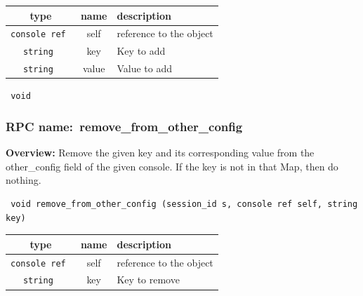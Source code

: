 
 
\vspace{0.3cm}
\begin{tabular}{|c|c|p{7cm}|}
 \hline
{\bf type} & {\bf name} & {\bf description} \\ \hline
{\tt console ref } & self & reference to the object \\ \hline 

{\tt string } & key & Key to add \\ \hline 

{\tt string } & value & Value to add \\ \hline 

\end{tabular}

\vspace{0.3cm}

{\tt 
void
}



\vspace{0.3cm}
\vspace{0.3cm}
\vspace{0.3cm}
\subsubsection{RPC name:~remove\_from\_other\_config}

{\bf Overview:} 
Remove the given key and its corresponding value from the other\_config
field of the given console.  If the key is not in that Map, then do
nothing.

\begin{verbatim} void remove_from_other_config (session_id s, console ref self, string key)\end{verbatim}



 
\vspace{0.3cm}
\begin{tabular}{|c|c|p{7cm}|}
 \hline
{\bf type} & {\bf name} & {\bf description} \\ \hline
{\tt console ref } & self & reference to the object \\ \hline 

{\tt string } & key & Key to remove \\ \hline 

\end{tabular}

\vspace{0.3cm}

